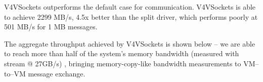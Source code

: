 \documentclass[a0paper,portrait,final]{baposter}
\begin{document}
\begin{poster}
{\begin{multicols}{2}

V4VSockets outperforms the default case for communication. V4VSockets is able
to achieve 2299 MB/s, 4.5x better than the split driver, which performs poorly
at 501 MB/s for 1 MB messages.

The aggregate throughput achieved by V4VSockets is shown below -- we are able to reach more than half of the system's memory bandwidth (measured with stream @ 27GB/s) %
, bringing memory-copy-like bandwidth measurements to VM--to--VM message exchange.

\end{multicols}

}

\end{poster}
\end{document}
